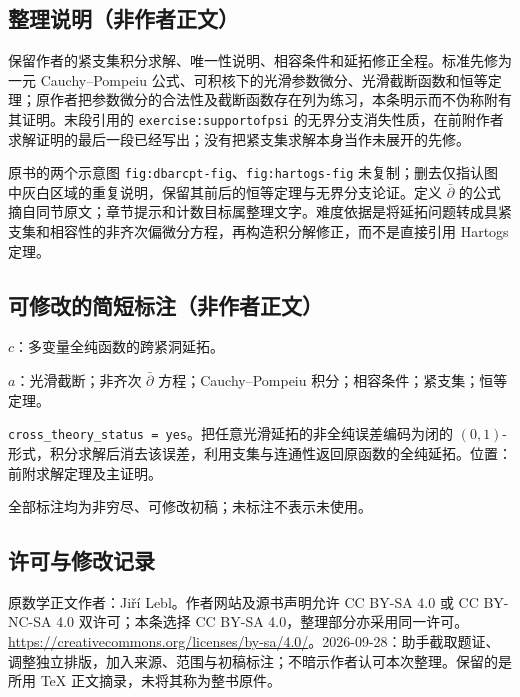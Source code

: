 \documentclass[UTF8,11pt]{ctexart}
\theoremstyle{definition}
\begin{document}
\subsection*{整理说明（非作者正文）}
保留作者的紧支集积分求解、唯一性说明、相容条件和延拓修正全程。标准先修为一元 Cauchy--Pompeiu 公式、可积核下的光滑参数微分、光滑截断函数和恒等定理；原作者把参数微分的合法性及截断函数存在列为练习，本条明示而不伪称附有其证明。末段引用的 \texttt{exercise:supportofpsi} 的无界分支消失性质，在前附作者求解证明的最后一段已经写出；没有把紧支集求解本身当作未展开的先修。

原书的两个示意图 \texttt{fig:dbarcpt-fig}、\texttt{fig:hartogs-fig} 未复制；删去仅指认图中灰白区域的重复说明，保留其前后的恒等定理与无界分支论证。定义 $\bar\partial$ 的公式摘自同节原文；章节提示和计数目标属整理文字。难度依据是将延拓问题转成具紧支集和相容性的非齐次偏微分方程，再构造积分解修正，而不是直接引用 Hartogs 定理。
\subsection*{可修改的简短标注（非作者正文）}
$c$：多变量全纯函数的跨紧洞延拓。

$a$：光滑截断；非齐次 $\bar\partial$ 方程；Cauchy--Pompeiu 积分；相容条件；紧支集；恒等定理。

\texttt{cross\_theory\_status = yes}。把任意光滑延拓的非全纯误差编码为闭的 $(0,1)$-形式，积分求解后消去该误差，利用支集与连通性返回原函数的全纯延拓。位置：前附求解定理及主证明。

全部标注均为非穷尽、可修改初稿；未标注不表示未使用。
\subsection*{许可与修改记录}
原数学正文作者：Ji\v{r}\'i Lebl。作者网站及源书声明允许 CC BY-SA 4.0 或 CC BY-NC-SA 4.0 双许可；本条选择 CC BY-SA 4.0，整理部分亦采用同一许可。\url{https://creativecommons.org/licenses/by-sa/4.0/}。2026-09-28：助手截取题证、调整独立排版，加入来源、范围与初稿标注；不暗示作者认可本次整理。保留的是所用 TeX 正文摘录，未将其称为整书原件。
\end{document}
